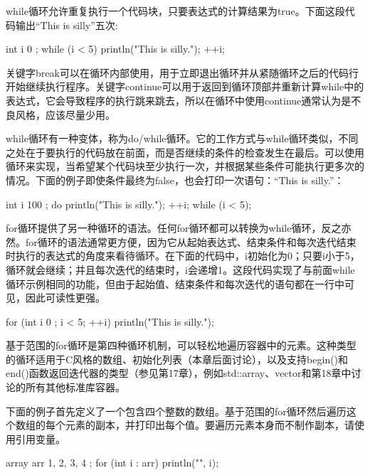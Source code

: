 
while循环允许重复执行一个代码块，只要表达式的计算结果为true。下面这段代码输出“This is silly”五次:

\begin{cpp}
int i { 0 };
while (i < 5) {
    println("This is silly.");
    ++i;
}
\end{cpp}

关键字break可以在循环内部使用，用于立即退出循环并从紧随循环之后的代码行开始继续执行程序。关键字continue可以用于返回到循环顶部并重新计算while中的表达式，它会导致程序的执行跳来跳去，所以在循环中使用continue通常认为是不良风格，应该尽量少用。


while循环有一种变体，称为do/while循环。它的工作方式与while循环类似，不同之处在于要执行的代码放在前面，而是否继续的条件的检查发生在最后。可以使用循环来实现，当希望某个代码块至少执行一次，并根据某些条件可能执行更多次的情况。下面的例子即使条件最终为false，也会打印一次语句：“This is silly.”：

\begin{cpp}
int i { 100 };
do {
    println("This is silly.");
    ++i;
} while (i < 5);
\end{cpp}


for循环提供了另一种循环的语法。任何for循环都可以转换为while循环，反之亦然。for循环的语法通常更方便，因为它从起始表达式、结束条件和每次迭代结束时执行的表达式的角度来看待循环。在下面的代码中，i初始化为0；只要i小于5，循环就会继续；并且每次迭代的结束时，i会递增1。这段代码实现了与前面while循环示例相同的功能，但由于起始值、结束条件和每次迭代的语句都在一行中可见，因此可读性更强。

\begin{cpp}
for (int i { 0 }; i < 5; ++i) {
    println("This is silly.");
}
\end{cpp}


基于范围的for循环是第四种循环机制，可以轻松地遍历容器中的元素。这种类型的循环适用于C风格的数组、初始化列表（本章后面讨论），以及支持begin()和end()函数返回迭代器的类型（参见第17章），例如std::array、vector和第18章中讨论的所有其他标准库容器。

下面的例子首先定义了一个包含四个整数的数组。基于范围的for循环然后遍历这个数组的每个元素的副本，并打印出每个值。要遍历元素本身而不制作副本，请使用引用变量。

\begin{cpp}
array arr { 1, 2, 3, 4 };
for (int i : arr) { println("{}", i); }
\end{cpp}


